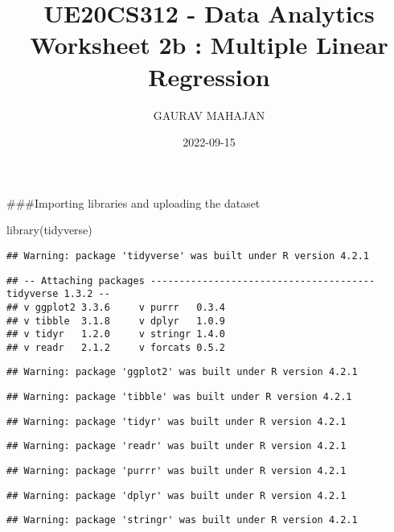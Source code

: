 \documentclass[
]{article}
\title{UE20CS312 - Data Analytics Worksheet 2b : Multiple Linear
Regression}
\author{GAURAV MAHAJAN}
\date{2022-09-15}
\newenvironment{Shaded}{\begin{snugshade}}{\end{snugshade}}
\newcommand{\FunctionTok}[1]{\textcolor[rgb]{0.00,0.00,0.00}{#1}}
\newcommand{\NormalTok}[1]{#1}
\begin{document}
\maketitle

\#\#\#Importing libraries and uploading the dataset

\begin{Shaded}
\begin{Highlighting}[]
\FunctionTok{library}\NormalTok{(tidyverse)}
\end{Highlighting}
\end{Shaded}

\begin{verbatim}
## Warning: package 'tidyverse' was built under R version 4.2.1
\end{verbatim}

\begin{verbatim}
## -- Attaching packages --------------------------------------- tidyverse 1.3.2 --
## v ggplot2 3.3.6     v purrr   0.3.4
## v tibble  3.1.8     v dplyr   1.0.9
## v tidyr   1.2.0     v stringr 1.4.0
## v readr   2.1.2     v forcats 0.5.2
\end{verbatim}

\begin{verbatim}
## Warning: package 'ggplot2' was built under R version 4.2.1
\end{verbatim}

\begin{verbatim}
## Warning: package 'tibble' was built under R version 4.2.1
\end{verbatim}

\begin{verbatim}
## Warning: package 'tidyr' was built under R version 4.2.1
\end{verbatim}

\begin{verbatim}
## Warning: package 'readr' was built under R version 4.2.1
\end{verbatim}

\begin{verbatim}
## Warning: package 'purrr' was built under R version 4.2.1
\end{verbatim}

\begin{verbatim}
## Warning: package 'dplyr' was built under R version 4.2.1
\end{verbatim}

\begin{verbatim}
## Warning: package 'stringr' was built under R version 4.2.1
\end{verbatim}
\end{document}
